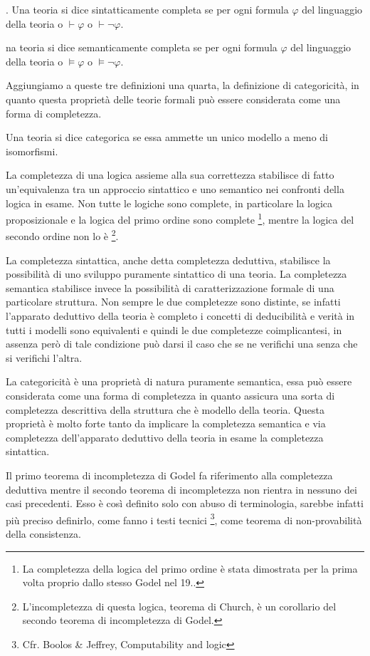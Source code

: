 \emph{}. Una teoria si dice sintatticamente completa
se per ogni formula $\varphi$ del linguaggio della teoria o $\vdash\varphi$
o $\vdash\neg\varphi$.

\emph{}na teoria si dice semanticamente completa
se per ogni formula $\varphi$ del linguaggio della teoria o $\models\varphi$
o $\models\neg\varphi$.

Aggiungiamo a queste tre definizioni una quarta, la definizione di
categoricità, in quanto questa proprietà delle teorie formali può
essere considerata come una forma di completezza.

\emph{}Una teoria si dice categorica se essa
ammette un unico modello a meno di isomorfismi.

La completezza di una logica assieme alla sua correttezza stabilisce
di fatto un'equivalenza tra un approccio sintattico e uno semantico
nei confronti della logica in esame. Non tutte le logiche sono complete,
in particolare la logica proposizionale e la logica del primo ordine
sono complete%
\footnote{La completezza della logica del primo ordine è stata dimostrata per
la prima volta proprio dallo stesso Godel nel 19..%
}, mentre la logica del secondo ordine non lo è%
\footnote{L'incompletezza di questa logica, teorema di Church, è un corollario
del secondo teorema di incompletezza di Godel.%
}.

La completezza sintattica, anche detta completezza deduttiva, stabilisce
la possibilità di uno sviluppo puramente sintattico di una teoria.
La completezza semantica stabilisce invece la possibilità di caratterizzazione
formale di una particolare struttura. Non sempre le due completezze
sono distinte, se infatti l'apparato deduttivo della teoria è completo
i concetti di deducibilità e verità in tutti i modelli sono equivalenti
e quindi le due completezze coimplicantesi, in assenza però di tale
condizione può darsi il caso che se ne verifichi una senza che si
verifichi l'altra.

La categoricità è una proprietà di natura puramente semantica, essa
può essere considerata come una forma di completezza in quanto assicura
una sorta di completezza descrittiva della struttura che è modello
della teoria. Questa proprietà è molto forte tanto da implicare la
completezza semantica e via completezza dell'apparato deduttivo della
teoria in esame la completezza sintattica.

Il primo teorema di incompletezza di Godel fa riferimento alla completezza
deduttiva mentre il secondo teorema di incompletezza non rientra in
nessuno dei casi precedenti. Esso è così definito solo con abuso di
terminologia, sarebbe infatti più preciso definirlo, come fanno i
testi tecnici %
\footnote{Cfr. Boolos \& Jeffrey, Computability and logic%
}, come teorema di non-provabilità della consistenza.


